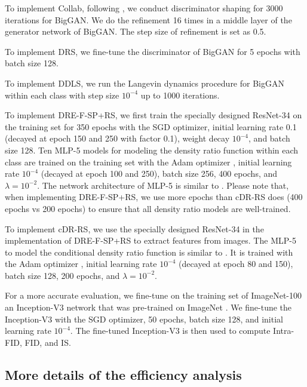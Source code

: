 \documentclass[final,12pt, 3p,times]{elsarticle}
\begin{document}
To implement Collab, following \cite{liu2020collaborative}, we conduct discriminator shaping for 3000 iterations for BigGAN. We do the refinement 16 times in a middle layer of the generator network of BigGAN. The step size of refinement is set as 0.5. 

To implement DRS, we fine-tune the discriminator of BigGAN for 5 epochs with batch size 128.  

To implement DDLS, we run the Langevin dynamics procedure for BigGAN within each class with step size $10^{-4}$ up to 1000 iterations.

To implement DRE-F-SP+RS, we first train the specially designed ResNet-34 on the training set for 350 epochs with the SGD optimizer, initial learning rate 0.1 (decayed at epoch 150 and 250 with factor 0.1), weight decay $10^{-4}$, and batch size 128. Ten MLP-5 models for modeling the density ratio function within each class are trained on the training set with the Adam optimizer \cite{kingma2014adam}, initial learning rate $10^{-4}$ (decayed at epoch 100 and 250), batch size 256, 400 epochs, and $\lambda=10^{-2}$. The network architecture of MLP-5 is similar to . Please note that, when implementing DRE-F-SP+RS, we use more epochs than cDR-RS does (400 epochs vs 200 epochs) to ensure that all density ratio models are well-trained. 

To implement cDR-RS, we use the specially designed ResNet-34 in the implementation of DRE-F-SP+RS to extract features from images. The MLP-5 to model the conditional density ratio function is similar to . It is trained with the Adam optimizer \cite{kingma2014adam}, initial learning rate $10^{-4}$ (decayed at epoch 80 and 150), batch size 128, 200 epochs, and $\lambda=10^{-2}$.

For a more accurate evaluation, we fine-tune on the training set of ImageNet-100 \cite{cao2017hashnet} an Inception-V3 network that was pre-trained on ImageNet \cite{imagenet_cvpr09}. We fine-tune the Inception-V3 with the SGD optimizer, 50 epochs, batch size 128, and initial learning rate $10^{-4}$. The fine-tuned Inception-V3 is then used to compute Intra-FID, FID, and IS.


\subsection{More details of the efficiency analysis}
\end{document}
